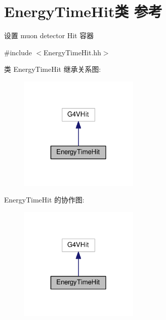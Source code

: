 \hypertarget{classEnergyTimeHit}{}\section{Energy\+Time\+Hit类 参考}
\label{classEnergyTimeHit}


设置 muon detector Hit 容器  




{\ttfamily \#include $<$Energy\+Time\+Hit.\+hh$>$}



类 Energy\+Time\+Hit 继承关系图\+:\nopagebreak
\begin{figure}[H]
\begin{center}
\leavevmode
\includegraphics[width=162pt]{classEnergyTimeHit__inherit__graph}
\end{center}
\end{figure}


Energy\+Time\+Hit 的协作图\+:\nopagebreak
\begin{figure}[H]
\begin{center}
\leavevmode
\includegraphics[width=162pt]{classEnergyTimeHit__coll__graph}
\end{center}
\end{figure}
